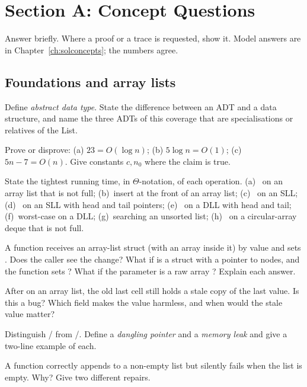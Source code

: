 \chapter{Section A: Concept Questions}\label{ch:concepts}

Answer briefly. Where a proof or a trace is requested, show it. Model answers are in
Chapter~\ref{ch:solconcepts}; the numbers agree.

\section*{Foundations and array lists}
\begin{questions}
\item\label{q:adt} Define \emph{abstract data type}. State the difference between an ADT and a data
  structure, and name the three ADTs of this coverage that are specialisations or
  relatives of the List.
\item Prove or disprove: (a) $23=O(\log n)$; (b) $5\log n=O(1)$; (c) $5n-7=O(n)$. Give
  constants $c,n_0$ where the claim is true.
\item State the tightest running time, in $\Theta$-notation, of each operation.
  (a)~ on an array list that is not full; (b)~insert at the front of an
  array list; (c)~ on an SLL; (d)~ on an SLL with head and
  tail pointers; (e)~ on a DLL with head and tail; (f)~worst-case
   on a DLL; (g)~searching an unsorted list; (h)~ on a
  circular-array deque that is not full.
\item A function  receives an array-list struct (with an array inside
  it) by value and sets . Does the caller see the change? What if
   is a struct with a  pointer to nodes, and the function sets
  ? What if the parameter is a raw array ? Explain each
  answer.
\item After  on an array list, the old last cell still holds a stale copy of
  the last value. Is this a bug? Which field makes the value harmless, and when would the
  stale value matter?
\item Distinguish / from /. Define a \emph{dangling
  pointer} and a \emph{memory leak} and give a two-line example of each.
\item A function  correctly appends to a non-empty list
  but silently fails when the list is empty. Why? Give two different repairs.

\end{questions}
